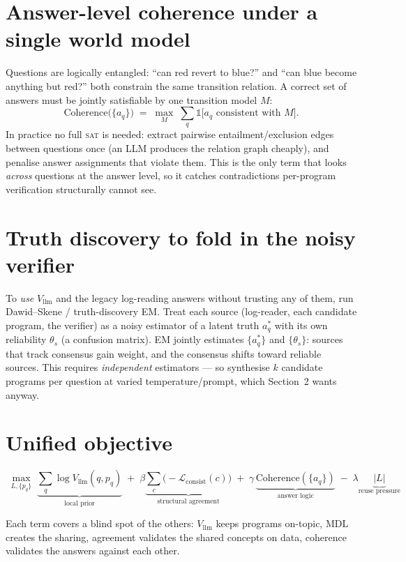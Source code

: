 \documentclass[11pt]{article}
\newcommand{\Vllm}{V_{\mathrm{llm}}}
\newcommand{\Lconsist}{\mathcal{L}_{\mathrm{consist}}}
\begin{document}
\section{Answer-level coherence under a single world model}

Questions are logically entangled: ``can red revert to blue?'' and ``can blue
become anything but red?'' both constrain the same transition relation. A correct
set of answers must be jointly satisfiable by one transition model $M$:
\[
\text{Coherence}\big(\{a_q\}\big) \;=\;
\max_{M}\;\sum_q \mathbb{1}\!\big[a_q \text{ consistent with } M\big].
\]
In practice no full \textsc{sat} is needed: extract pairwise
entailment/exclusion edges between questions once (an LLM produces the relation
graph cheaply), and penalise answer assignments that violate them. This is the
only term that looks \emph{across} questions at the answer level, so it catches
contradictions per-program verification structurally cannot see.

\section{Truth discovery to fold in the noisy verifier}

To \emph{use} $\Vllm$ and the legacy log-reading answers without trusting any of
them, run Dawid--Skene / truth-discovery EM. Treat each source (log-reader, each
candidate program, the verifier) as a noisy estimator of a latent truth $a_q^*$
with its own reliability $\theta_s$ (a confusion matrix). EM jointly estimates
$\{a_q^*\}$ and $\{\theta_s\}$: sources that track consensus gain weight, and the
consensus shifts toward reliable sources. This requires \emph{independent}
estimators --- so synthesise $k$ candidate programs per question at varied
temperature/prompt, which Section~2 wants anyway.

\section{Unified objective}

\[
\boxed{\;
\max_{L,\{p_q\}}\;
\underbrace{\sum_q \log \Vllm(q,p_q)}_{\text{local prior}}
\;+\; \beta\underbrace{\sum_c\big(-\Lconsist(c)\big)}_{\text{structural agreement}}
\;+\; \gamma\,\underbrace{\text{Coherence}(\{a_q\})}_{\text{answer logic}}
\;-\; \lambda\underbrace{|L|}_{\text{reuse pressure}}
\;}
\]

Each term covers a blind spot of the others: $\Vllm$ keeps programs on-topic,
MDL creates the sharing, agreement validates the shared concepts on data,
coherence validates the answers against each other.
\end{document}
